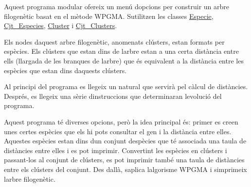 Aquest programa modular ofereix un menú d\textquotesingle{}opcions per construir un arbre filogenètic basat en el mètode W\+P\+G\+MA. S\textquotesingle{}utilitzen les classes \hyperlink{class_especie}{Especie}, \hyperlink{class_cjt___especies}{Cjt\+\_\+\+Especies}, \hyperlink{class_cluster}{Cluster} i \hyperlink{class_cjt___clusters}{Cjt\+\_\+\+Clusters}.

Els nodes d\textquotesingle{}aquest arbre filogenètic, anomenats clústers, estan formats per espècies. Els clústers que estan dins de l\textquotesingle{}arbre estan a una certa distància entre ells (llargada de les branques de l\textquotesingle{}arbre) que és equivalent a la distància entre les espècies que estan dins d\textquotesingle{}aquests clústers.

Al principi del programa es llegeix un natural que servirà pel càlcul de distàncies. Després, es llegeix una sèrie d\textquotesingle{}instruccions que determinaran l\textquotesingle{}evolució del programa.

Aquest programa té diverses opcions, però la idea principal és\+: primer es creen unes certes espècies que els hi pots consultar el gen i la distància entre elles. Aquestes espècies estan dins d\textquotesingle{}un conjunt d\textquotesingle{}espècies que té associada una taula de distàncies entre elles i es pot imprimir. Convertint les espècies en clústers i passant-\/los al conjunt de clústers, es pot imprimir també una taula de distàncies entre els clústers del conjunt. Des d\textquotesingle{}allà, s\textquotesingle{}aplica l\textquotesingle{}algorisme W\+P\+G\+MA i s\textquotesingle{}imprimeix l\textquotesingle{}arbre filogenètic. 